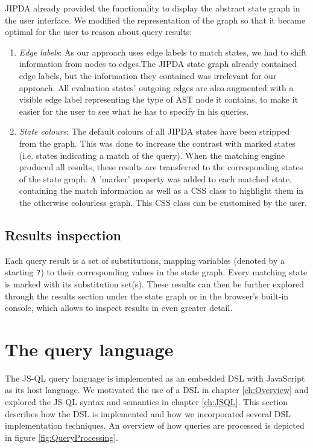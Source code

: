 JIPDA already provided the functionality to display the abstract state graph in the user interface. We modified the representation of the graph so that it became optimal for the user to reason about query results:
\begin{enumerate}
\item \textit{Edge labels}: As our approach uses edge labels to match states, we had to shift information from nodes to edges.The JIPDA state graph already contained edge labels, but the information they contained was irrelevant for our approach. All evaluation states' outgoing edges are also augmented with a visible edge label representing the type of AST node it contains, to make it easier for the user to see what he has to specify in his queries.
\item \textit{State colours}: The default colours of all JIPDA states have been stripped from the graph. This was done to increase the contrast with marked states (i.e. states indicating a match of the query). When the matching engine produced all results, these results are transferred to the corresponding states of the state graph. A 'marker' property was added to each matched state, containing the match information as well as a CSS class to highlight them in the otherwise colourless graph. This CSS class can be customised by the user.
\end{enumerate}

\subsection*{Results inspection}

Each query result is a set of substitutions, mapping variables (denoted by a starting \texttt{?}) to their corresponding values in the state graph. Every matching state is marked with its substitution set(s). These results can then be further explored through the results section under the state graph or in the browser's built-in console, which allows to inspect results in even greater detail.


\section{The query language}
\label{sec:queryLanguageImpl}
The JS-QL query language is implemented as an embedded DSL with JavaScript as its host language. We motivated the use of a DSL in chapter \ref{ch:Overview} and explored the JS-QL syntax and semantics in chapter \ref{ch:JSQL}. This section describes how the DSL is implemented and how we incorporated several DSL implementation techniques. An overview of how queries are processed is depicted in figure \ref{fig:QueryProcessing}.

